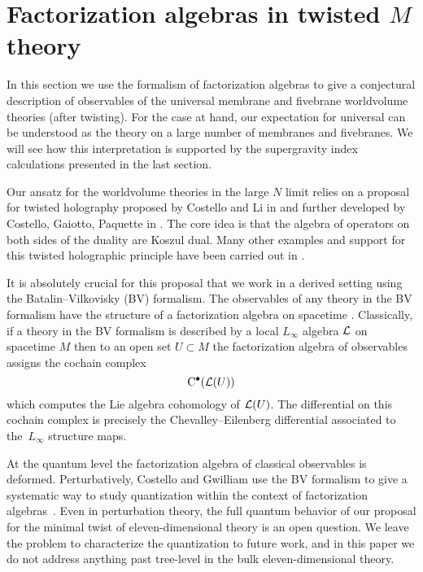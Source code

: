 %
%
%

\section{Factorization algebras in twisted $M$ theory}
\label{s:fact}

In this section we use the formalism of factorization algebras to give a conjectural description of observables of the universal membrane and fivebrane worldvolume theories (after twisting).
For the case at hand, our expectation for universal can be understood as the theory on a large number of membranes and fivebranes. 
We will see how this interpretation is supported by the supergravity index calculations presented in the last section. 

Our ansatz for the worldvolume theories in the large $N$ limit relies on a proposal for twisted holography proposed by Costello and Li in \cite{CLsugra} and further developed by Costello, Gaiotto, Paquette in \cite{CostelloM2,CostelloOmega,costello2021twisted,CP}.
The core idea is that the algebra of operators on both sides of the duality are Koszul dual. 
Many other examples and support for this twisted holographic principle have been carried out in \cite{Oh:2021wes,Oh:2020hph,Gaiotto:2021xce}. 

It is absolutely crucial for this proposal that we work in a derived setting using the Batalin--Vilkovisky (BV) formalism. 
The observables of any theory in the BV formalism have the structure of a factorization algebra on spacetime \cite{CG2}. 
Classically, if a theory in the BV formalism is described by a local $L_\infty$ algebra $\mathcal L$ on spacetime $M$ then to an open set $U \subset M$ the factorization algebra of observables assigns the cochain complex
\[
{\rm C}^\bullet(\mathcal L(U))
\]
which computes the Lie algebra cohomology of $\mathcal L(U)$. 
The differential on this cochain complex is precisely the Chevalley--Eilenberg differential associated to the~$L_\infty$ structure maps. 

At the quantum level the factorization algebra of classical observables is deformed.
Perturbatively, Costello and Gwilliam use the BV formalism to give a systematic way to study quantization within the context of factorization algebras~\cite{CG2}. 
Even in perturbation theory, the full quantum behavior of our proposal for the minimal twist of eleven-dimensional theory is an open question. 
We leave the problem to characterize the quantization to future work, and in this paper we do not address anything past tree-level in the bulk eleven-dimensional theory.

